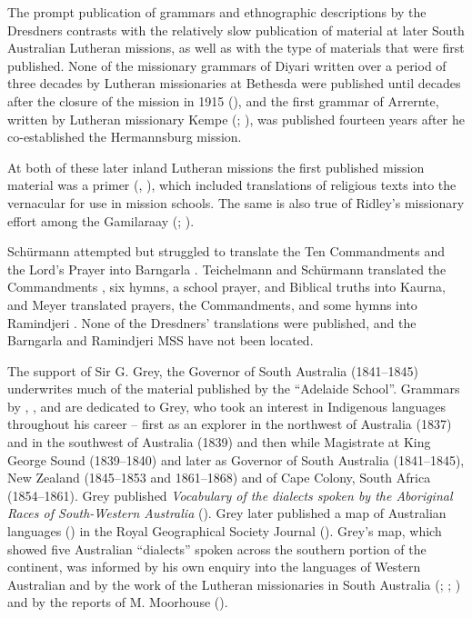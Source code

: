 The prompt publication of grammars and ethnographic descriptions by the Dresdners contrasts with the relatively slow publication of material at later South Australian Lutheran missions, as well as with the type of materials that were first published. None of the missionary grammars of Diyari written over a period of three decades by Lutheran missionaries at Bethesda were published until decades after the closure of the mission in 1915 (), and the first grammar of Arrernte, written by Lutheran missionary Kempe (\citeyear{kempe_grammar_1891}; ), was published fourteen years after he co-established the Hermannsburg mission.

At both of these later inland Lutheran missions the first published mission material was a primer (\citealt{homann_1870}, \citealt{kempe_intalinja_1880}), which included translations of religious texts into the vernacular for use in mission schools. The same is also true of Ridley’s missionary effort among the Gamilaraay (\citealt{ridley_gurre_1856}; ).

Schürmann attempted but struggled to translate the Ten Commandments and the Lord’s Prayer into Barngarla \citep[78--81]{rathjen_difficult_1998}. Teichelmann and Schürmann translated the Commandments \citep[111]{amery_warrabarna_2016}, six hymns, a school prayer, and Biblical truths \citep[78]{amery_warrabarna_2016} into Kaurna, and Meyer translated prayers, the Commandments, and some hymns into Ramindjeri \citep[75]{gale_nothing_2011}. None of the Dresdners' translations were published, and the Barngarla and Ramindjeri MSS have not been located.

The support of Sir G. Grey, the Governor of South Australia (1841--1845) underwrites much of the material published by the ``Adelaide School''. Grammars by \citet[v: iii]{schurmann_vocabulary_1844}, \citet[iv]{meyer_vocabulary_1843}, and \citet[v]{moorhouse_vocabulary_1846} are dedicated to Grey, who took an interest in Indigenous languages throughout his career -- first as an explorer in the northwest of Australia (1837) and in the southwest of Australia (1839) and then while Magistrate at King George Sound (1839--1840) and later as Governor of South Australia (1841--1845), New Zealand (1845--1853 and 1861--1868) and of Cape Colony, South Africa (1854--1861). Grey published \textit{Vocabulary of the dialects spoken by the Aboriginal Races of South-Western Australia} (\citeyear{grey_vocabulary_1839}). Grey later published a map of Australian languages (\citeyear{grey_languages_1845}) in the Royal Geographical Society Journal (). Grey’s map, which showed five Australian “dialects” spoken across the southern portion of the continent, was informed by his own enquiry into the languages of Western Australian and by the work of the Lutheran missionaries in South Australia (\citealt{teichelmann1940}; \citealt{meyer_vocabulary_1843}; \citealt{schurmann_vocabulary_1844}) and by the reports of M. Moorhouse ().

